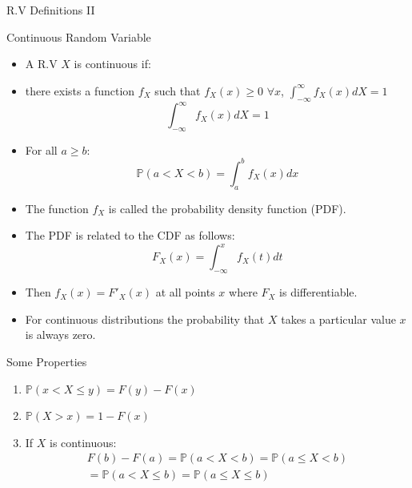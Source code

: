 \documentclass[handout]{beamer}
\begin{document}
\begin{frame}{R.V Definitions II}
\scriptsize{
\begin{block}{Continuous Random Variable}
\begin{itemize}
 \item A R.V $X$ is continuous if:
 \item there exists a function  $f_{X}$ such that $f_{X}(x) \geq 0$ $\forall x$,  $\int_{-\infty}^{\infty}f_{X}(x)dX=1$
 \begin{displaymath}
      \int_{-\infty}^{\infty}f_{X}(x)dX=1
       \end{displaymath}
\item For all $a \geq b$:
\begin{displaymath}
 \mathbb{P}(a < X < b) = \int_{a}^{b} f_{X}(x)dx
\end{displaymath}
\end{itemize}

\end{block}

\begin{itemize}
 \item The function $f_{X}$ is called the probability density function (PDF). 
 \item The PDF is related to the CDF as follows:
 \begin{displaymath}
 F_{X}(x)=\int_{-\infty}^{x}f_{X}(t)dt 
 \end{displaymath}
\item Then $f_{X}(x) = F'_X(x)$ at all points $x$ where $F_{X}$ is differentiable.
\item For continuous distributions the probability that $X$ takes a particular value $x$ is always zero.

\end{itemize}




}
\end{frame}

\begin{frame}{Some Properties}

\begin{enumerate}
 \item $ \mathbb{P}( x < X \leq y) = F(y) - F(x)$
       

\item $ \mathbb{P}(X > x) = 1 - F(x)$ 

\item If $X$ is continuous: 
\begin{eqnarray*}
 F(b) - F(a) = \mathbb{P}(a < X < b) = \mathbb{P} ( a \leq X < b)  \\
   = \mathbb{P} ( a < X \leq b) = \mathbb{P} ( a \leq X \leq b) 
\end{eqnarray*}

\end{enumerate}



 
\end{frame}
\end{document}
